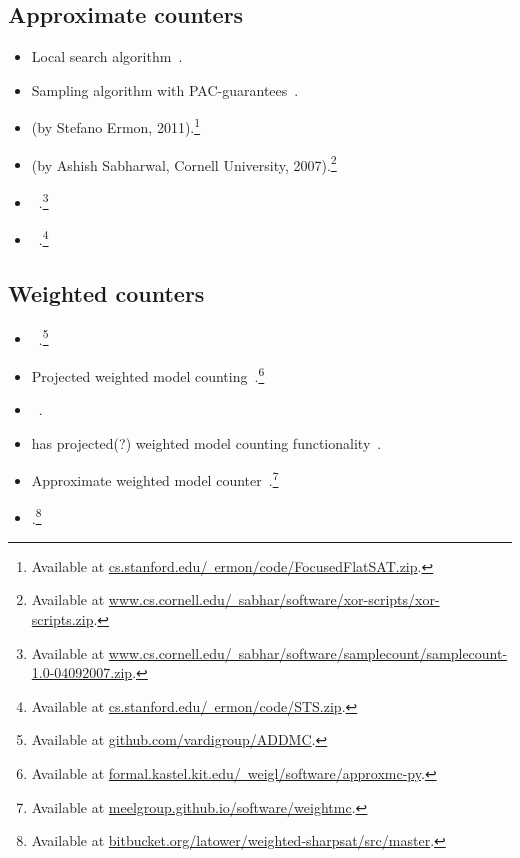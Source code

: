 \documentclass[a4paper]{tufte-handout}
\begin{document}
\begin{counters}
		\subsection*{Approximate counters}
		\begin{itemize}
			\item \approxcount{} Local search algorithm~\citep{WS05}.
			\item \approxmc{} Sampling algorithm with PAC-guarantees~\citep{CMV16,SM19,SGM20}.
			\item \focusedflatsat{} (by Stefano Ermon, 2011).\footnote{Available at \href{cs.stanford.edu/~ermon/code/FocusedFlatSAT.zip}{cs.stanford.edu/~ermon/code/FocusedFlatSAT.zip}.}
			\item \mbound{} (by Ashish Sabharwal, Cornell University, 2007).\footnote{Available at \href{www.cs.cornell.edu/~sabhar/software/xor-scripts/xor-scripts.zip}{www.cs.cornell.edu/~sabhar/software/xor-scripts/xor-scripts.zip}.}
			\item \samplecount{}~\citep{GHS+07}.\footnote{Available at \href{www.cs.cornell.edu/~sabhar/software/samplecount/samplecount-1.0-04092007.zip}{www.cs.cornell.edu/~sabhar/software/samplecount/samplecount-1.0-04092007.zip}.}
			\item \searchtreesampler{}~\citep{EGS12}.\footnote{Available at \href{cs.stanford.edu/~ermon/code/STS.zip}{cs.stanford.edu/~ermon/code/STS.zip}.}
		\end{itemize}
		
		\subsection*{Weighted counters}
		\begin{itemize}
			\item \addmc{}~\citep{DPV20}.\footnote{Available at \href{https://github.com/vardigroup/ADDMC}{github.com/vardigroup/ADDMC}.}
			\item \approxmcp{} Projected weighted model counting~\citep{KWW16}.\footnote{Available at \href{https://formal.kastel.kit.edu/~weigl/software/approxmc-py}{formal.kastel.kit.edu/~weigl/software/approxmc-py}.}
			\item \cachetwmc{}~\citep{SBK05b}.
			\item \ganak{} has projected(?) weighted model counting functionality~\citep{SSS+19}.
			\item \weightMC{} Approximate weighted model counter~\citep{CFM+14}.\footnote{Available at \href{https://meelgroup.github.io/software/weightmc/}{meelgroup.github.io/software/weightmc}.}
			\item \weightedsharpsat{}.\footnote{Available at \href{https://bitbucket.org/latower/weighted-sharpsat/src/master/}{bitbucket.org/latower/weighted-sharpsat/src/master}.}
		\end{itemize}
		

\end{counters}
\end{document}

